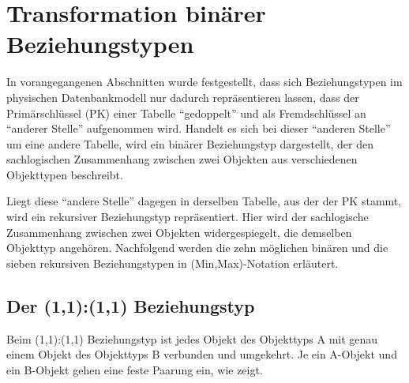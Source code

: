     \section{Transformation bin\"arer Beziehungstypen}
      In vorangegangenen Abschnitten wurde festgestellt, dass sich Beziehungstypen im physischen Datenbankmodell nur dadurch repr\"asentieren lassen, dass der Prim\"arschl\"ussel (PK) einer Tabelle \enquote{gedoppelt} und als Fremdschl\"ussel an \enquote{anderer Stelle} aufgenommen wird. Handelt es sich bei dieser \enquote{anderen Stelle} um eine andere Tabelle, wird ein bin\"arer Beziehungstyp dargestellt, der den sachlogischen Zusammenhang zwischen zwei Objekten aus verschiedenen Objekttypen beschreibt.

      Liegt diese \enquote{andere Stelle} dagegen in derselben Tabelle, aus der der PK stammt, wird ein rekursiver Beziehungstyp repr\"asentiert. Hier wird der sachlogische Zusammenhang zwischen zwei Objekten widergespiegelt, die demselben Objekttyp angeh\"oren. Nachfolgend werden die zehn m\"oglichen bin\"aren und die sieben rekursiven Beziehungstypen in (Min,Max)-Notation erl\"autert.
      \subsection{Der (1,1):(1,1) Beziehungstyp}
        Beim (1,1):(1,1) Beziehungstyp ist jedes Objekt des Objekttyps A mit genau einem Objekt des Objekttyps B verbunden und umgekehrt. Je ein A-Objekt und ein B-Objekt gehen eine feste Paarung ein, wie  zeigt. %


